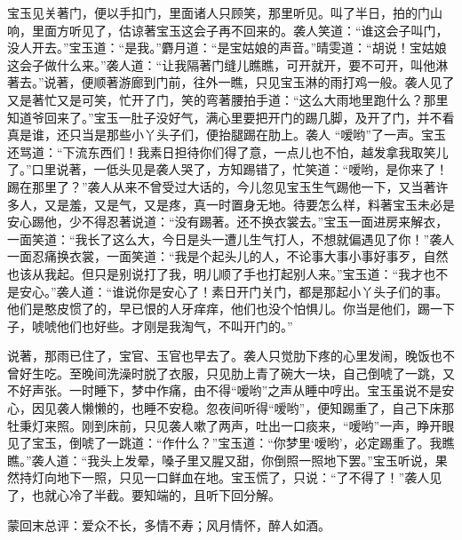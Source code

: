 \begin{parag}


    宝玉见关著门，便以手扣门，里面诸人只顾笑，那里听见。叫了半日，拍的门山响，里面方听见了，估谅著宝玉这会子再不回来的。袭人笑道：“谁这会子叫门，没人开去。”宝玉道：“是我。”麝月道：“是宝姑娘的声音。”晴雯道：“胡说！宝姑娘这会子做什么来。”袭人道：“让我隔著门缝儿瞧瞧，可开就开，要不可开，叫他淋著去。”说著，便顺著游廊到门前，往外一瞧，只见宝玉淋的雨打鸡一般。袭人见了又是著忙又是可笑，忙开了门，笑的弯著腰拍手道：“这么大雨地里跑什么？那里知道爷回来了。”宝玉一肚子没好气，满心里要把开门的踢几脚，及开了门，并不看真是谁，还只当是那些小丫头子们，便抬腿踢在肋上。袭人 “嗳哟”了一声。宝玉还骂道：“下流东西们！我素日担待你们得了意，一点儿也不怕，越发拿我取笑儿了。”口里说著，一低头见是袭人哭了，方知踢错了，忙笑道：“嗳哟，是你来了！踢在那里了？”袭人从来不曾受过大话的，今儿忽见宝玉生气踢他一下，又当著许多人，又是羞，又是气，又是疼，真一时置身无地。待要怎么样，料著宝玉未必是安心踢他，少不得忍著说道：“没有踢著。还不换衣裳去。”宝玉一面进房来解衣，一面笑道：“我长了这么大，今日是头一遭儿生气打人，不想就偏遇见了你！”袭人一面忍痛换衣裳，一面笑道：“我是个起头儿的人，不论事大事小事好事歹，自然也该从我起。但只是别说打了我，明儿顺了手也打起别人来。”宝玉道：“我才也不是安心。”袭人道：“谁说你是安心了！素日开门关门，都是那起小丫头子们的事。他们是憨皮惯了的，早已恨的人牙痒痒，他们也没个怕惧儿。你当是他们，踢一下子，唬唬他们也好些。才刚是我淘气，不叫开门的。”
\end{parag}


\begin{parag}


    说著，那雨已住了，宝官、玉官也早去了。袭人只觉肋下疼的心里发闹，晚饭也不曾好生吃。至晚间洗澡时脱了衣服，只见肋上青了碗大一块，自己倒唬了一跳，又不好声张。一时睡下，梦中作痛，由不得“嗳哟”之声从睡中哼出。宝玉虽说不是安心，因见袭人懒懒的，也睡不安稳。忽夜间听得“嗳哟”，便知踢重了，自己下床那牡秉灯来照。刚到床前，只见袭人嗽了两声，吐出一口痰来，“嗳哟”一声，睁开眼见了宝玉，倒唬了一跳道：“作什么？”宝玉道：“你梦里‘嗳哟’，必定踢重了。我瞧瞧。”袭人道：“我头上发晕，嗓子里又腥又甜，你倒照一照地下罢。”宝玉听说，果然持灯向地下一照，只见一口鲜血在地。宝玉慌了，只说：“了不得了！”袭人见了，也就心冷了半截。要知端的，且听下回分解。
\end{parag}

\begin{parag}

    \begin{note}蒙回末总评：爱众不长，多情不寿；风月情怀，醉人如酒。\end{note}
\end{parag}